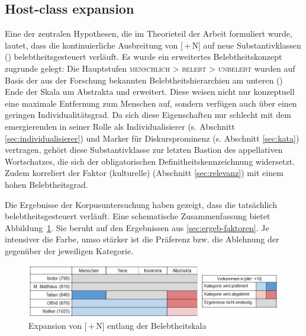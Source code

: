 \subsection{Host-class expansion}

Eine der zentralen Hypothesen, die im Theorieteil der Arbeit formuliert wurde, lautet, dass die kontinuierliche Ausbreitung von [\,+\,N] auf neue Substantivklassen ()  belebtheitsgesteuert  verläuft. Es wurde ein erweitertes Belebtheitskonzept  zugrunde gelegt: Die Hauptstufen \textsc{menschlich > belebt > unbelebt} wurden auf Basis der aus der Forschung bekannten Belebtheitshierarchien  \parencite[u.a.][]{Comrie1989,Yamamoto1999,Croft2006,Enger2011} am unteren () Ende der Skala um Abstrakta  und  erweitert. Diese weisen nicht nur konzeptuell eine maximale Entfernung zum Menschen auf, sondern verfügen auch über einen geringen  Individualitätsgrad. Da sich diese Eigenschaften nur schlecht mit dem emergierenden  in seiner Rolle als Individualisierer  (s. Abschnitt \ref{sec:individualisierer}) und Marker für Diskursprominenz (s. Abschnitt \ref{sec:kata}) vertragen, gehört diese Substantivklasse zur letzten Bastion des appellativen  Wortschatzes, die sich der obligatorischen Definitheitskennzeichnung widersetzt. Zudem korreliert der Faktor (kulturelle)  (Abschnitt \ref{sec:relevanz}) mit einem hohen  Belebtheitsgrad. 

Die Ergebnisse der Korpusuntersuchung  haben gezeigt, dass die  tatsächlich belebtheitsgesteuert  verläuft. Eine schematische Zusammenfassung bietet Abbildung~\ref{abb:expansion-belebtheit}. Sie beruht auf den Ergebnissen aus \ref{sec:ergeb-faktoren}. Je intensiver die Farbe, umso stärker ist die Präferenz bzw. die Ablehnung der gegenüber der jeweiligen Kategorie. 

\begin{figure}
  \includegraphics[width=\textwidth]{images/belebtheitsexpansion-neu.jpg}
\caption {Expansion von [\,+\,N] entlang der Belebtheitskala\label{abb:expansion-belebtheit}} 
\end{figure} 
  
